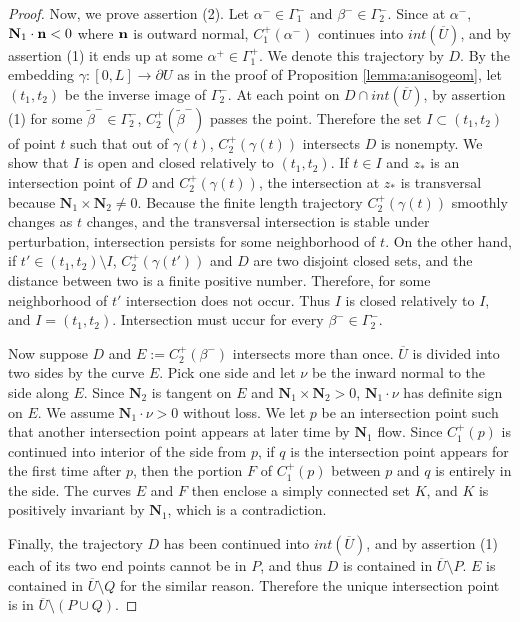 \documentclass[11pt]{amsart}
\theoremstyle{plain}
\theoremstyle{remark}
\numberwithin{equation}{section}
\numberwithin{Thm}{section}
\def\U{\overline{U}}
\def\N{{\mathbf N}}
\def\n{{\bf n}}
\begin{document}
\begin{proof}

Now, we prove assertion (2). Let $\alpha^-\in \Gamma^-_1$ and $\beta^-\in \Gamma^-_2$. Since at $\alpha^-$,  $\N_1\cdot\n < 0$ where $\n$ is outward normal, $C^+_1(\alpha^-)$ continues into $int(\overline{U})$, and by assertion (1) it ends up at some $\alpha^+\in \Gamma^+_1$. We denote this trajectory by $D$. By the embedding $\gamma: [0,L] \rightarrow \partial U$ as in the proof of Proposition \ref{lemma:anisogeom}, let $(t_1,t_2)$ be the inverse image of $\Gamma^-_2$. At each point on $D \cap int(\U)$, by assertion (1) for some $\tilde{\beta}^-\in \Gamma^-_2$, $C^+_2(\tilde \beta^-)$ passes the point. Therefore the set $I \subset (t_1,t_2)$ of point $t$ such that out of $\gamma(t)$, $C^+_2(\gamma(t))$ intersects $D$ is nonempty. We show that $I$ is open and closed relatively to $(t_1,t_2)$. If $t \in I$ and $z_*$ is an intersection point of $D$ and $C^+_2(\gamma(t))$, the intersection at $z_*$ is transversal  because $\N_1 \times \N_2 \ne 0$. Because the finite length trajectory $C^+_2(\gamma(t))$ smoothly changes as $t$ changes, and the transversal intersection is stable under perturbation, intersection persists for some neighborhood of $t$. On the other hand, if $t' \in (t_1,t_2) \setminus I$, $C^+_2(\gamma(t'))$ and $D$ are two disjoint closed sets, and the distance between two is a finite positive number. Therefore, for some neighborhood of $t'$ intersection does not occur. Thus $I$ is closed relatively to $I$, and $I = (t_1,t_2)$. Intersection must uccur for every $\beta^-\in \Gamma^-_2$.

Now suppose $D$ and $E:=C^+_2(\beta^-)$ intersects more than once. $\overline{U}$ is divided into two sides by the curve $E$. Pick one side and let $\nu$ be the inward normal to the side along $E$. Since $\N_2$ is tangent on $E$ and $\N_1\times \N_2>0$, $\N_1\cdot \nu$ has definite sign on $E$. We assume $\N_1\cdot \nu>0$ without loss. We let $p$ be an intersection point such that another intersection point appears at later time by $\N_1$ flow. Since $C^+_1(p)$ is continued into interior of the side from $p$, if $q$ is the intersection point appears for the first time after $p$, then the portion $F$ of $C^+_1(p)$ between $p$ and $q$ is entirely in the side. The curves $E$ and $F$ then enclose a simply connected set $K$, and $K$ is positively invariant by $\N_1$, which is a contradiction. 

Finally, the trajectory $D$ has been continued into $int(\overline{U})$, and by assertion (1) each of its two end points cannot be in $P$, and thus $D$ is contained in $\overline{U}\setminus P$. $E$ is contained in $\overline{U}\setminus Q$ for the similar reason. Therefore the unique intersection point is in $\overline{U}\setminus (P \cup Q)$.
\end{proof}
\end{document}
